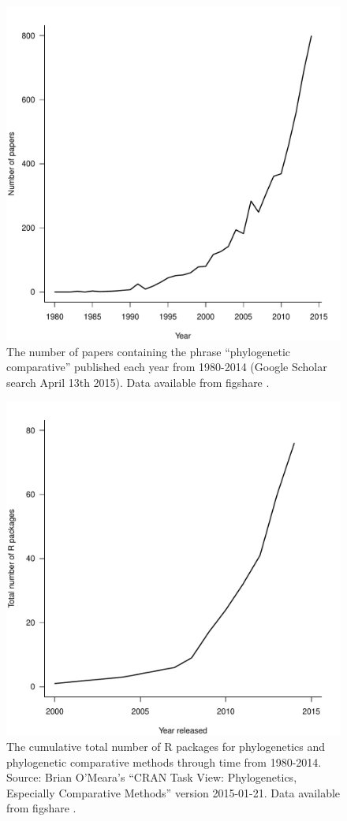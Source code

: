 \documentclass[a4paper,12pt]{article}
\begin{document}
  \begin{figure}[!htbp]
    \centering
      \includegraphics[width=12cm]{Figures/PCMCitations.pdf}
      \caption{The number of papers containing the phrase ``phylogenetic comparative'' published each year from 1980-2014 (Google Scholar search April 13th 2015). Data available from figshare \citep{coopermeedata}.
}
      \label{PCMCitations}
  \end{figure}

\newpage
  \begin{figure}[!htbp]
    \centering
      \includegraphics[width=12cm]{Figures/PCMRpackages.pdf}
      \caption{The cumulative total number of R packages for phylogenetics and phylogenetic comparative methods through time from 1980-2014. Source: Brian O'Meara's ``CRAN Task View: Phylogenetics, Especially Comparative Methods'' version 2015-01-21. Data available from figshare \citep{coopermeedata}.
}
      \label{PCMRpackages}
  \end{figure}
\end{document}
